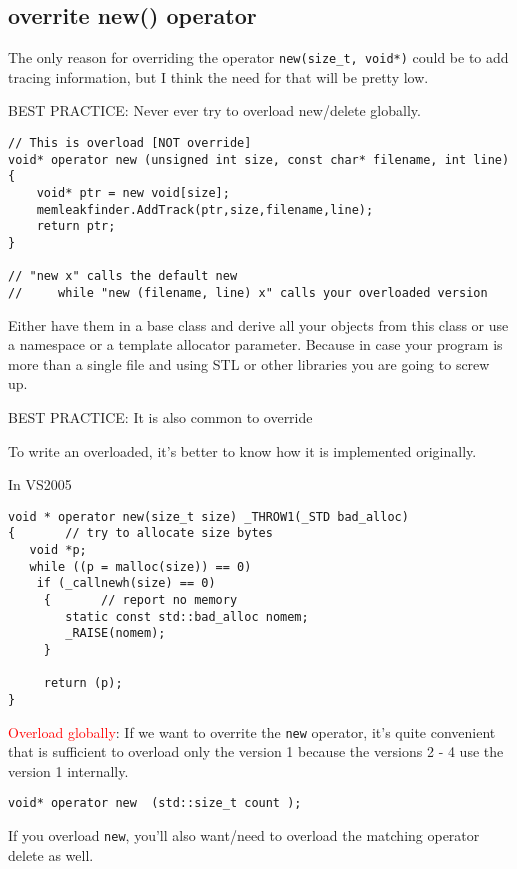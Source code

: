 \subsection{overrite new() operator}
\label{sec:new()-overwrite-it}


The only reason for overriding the operator \verb!new(size_t, void*)! could be to add
tracing information, but I think the need for that will be pretty low.


BEST PRACTICE: Never ever try to overload new/delete globally.
\begin{lstlisting}
// This is overload [NOT override]
void* operator new (unsigned int size, const char* filename, int line)
{
    void* ptr = new void[size];
    memleakfinder.AddTrack(ptr,size,filename,line);
    return ptr;
}

// "new x" calls the default new 
//     while "new (filename, line) x" calls your overloaded version
\end{lstlisting}
Either have them in a base class and derive all your objects from this class or
use a namespace or a template allocator parameter.
Because in case your program is more than a single file and using STL or other
libraries you are going to screw up.

BEST PRACTICE: It is also common to override

\begin{mdframed}
To write an overloaded, it's better to know how it is implemented originally.

In VS2005
\begin{lstlisting}
void * operator new(size_t size) _THROW1(_STD bad_alloc)
{       // try to allocate size bytes
   void *p;
   while ((p = malloc(size)) == 0)
    if (_callnewh(size) == 0)
     {       // report no memory
        static const std::bad_alloc nomem;
        _RAISE(nomem);
     }

     return (p);
}
\end{lstlisting}
\end{mdframed}

\textcolor{red}{Overload globally}: If we want to overrite the \verb!new!
operator, it's quite convenient that is sufficient to overload only the version
1 because the versions 2 - 4 use the version 1 internally.
\begin{verbatim}
void* operator new  (std::size_t count );
\end{verbatim}

If you overload \verb!new!, you'll also want/need to overload the matching
operator delete as well.

